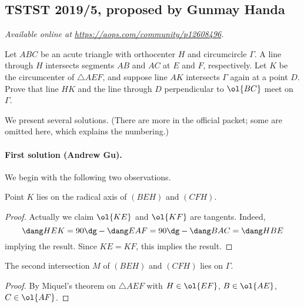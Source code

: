 \documentclass[11pt]{scrartcl}
\begin{document}
\subsection{TSTST 2019/5, proposed by Gunmay Handa}
\textsl{Available online at \url{https://aops.com/community/p12608496}.}
\begin{mdframed}[style=mdpurplebox,frametitle={Problem statement}]
Let $ABC$ be an acute triangle with orthocenter $H$ and circumcircle $\Gamma$.
A line through $H$ intersects segments $AB$ and $AC$ at $E$ and $F$, respectively.
Let $K$ be the circumcenter of $\triangle AEF$,
and suppose line $AK$ intersects $\Gamma$ again at a point $D$.
Prove that line $HK$ and the line through $D$
perpendicular to $\ol{BC}$ meet on $\Gamma$.
\end{mdframed}
We present several solutions.
(There are more in the official packet; some are omitted here,
which explains the numbering.)

\paragraph{First solution (Andrew Gu).}
We begin with the following two observations.
\begin{claim*}
  Point $K$ lies on the radical axis of $(BEH)$ and $(CFH)$.
\end{claim*}
\begin{proof}
  Actually we claim $\ol{KE}$ and $\ol{KF}$ are tangents.
  Indeed,
  \[ \dang HEK = 90\dg - \dang EAF = 90\dg - \dang BAC = \dang HBE \]
  implying the result.
  Since $KE = KF$, this implies the result.
\end{proof}

\begin{claim*}
  The second intersection $M$ of $(BEH)$ and $(CFH)$ lies on $\Gamma$.
\end{claim*}
\begin{proof}
  By Miquel's theorem on $\triangle AEF$ with $H \in \ol{EF}$,
  $B \in \ol{AE}$, $C \in \ol{AF}$.
\end{proof}
\end{document}
